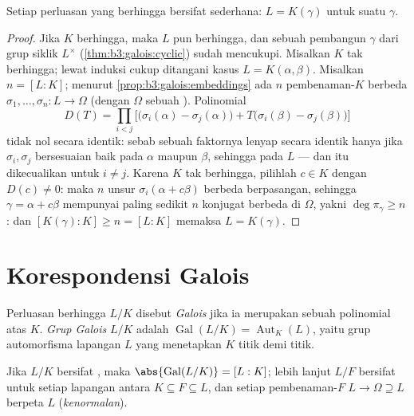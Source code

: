 \begin{theorem}\label{thm:b3:galois:primitive}
Setiap perluasan \emph{} yang berhingga bersifat sederhana: $L =
K(\gamma)$ untuk suatu $\gamma$.
\end{theorem}

\begin{proof}
Jika $K$ berhingga, maka $L$ pun berhingga, dan sebuah pembangun $\gamma$ dari
grup siklik $L^\times$ (\cref{thm:b3:galois:cyclic}) sudah mencukupi.
Misalkan $K$ tak berhingga; lewat induksi cukup ditangani kasus $L =
K(\alpha, \beta)$. Misalkan $n = [L:K]$; menurut
\cref{prop:b3:galois:embeddings} ada $n$ pembenaman-$K$ berbeda
$\sigma_1, \dots, \sigma_n \colon L \to \Omega$
(dengan $\Omega$ sebuah ). Polinomial
\[
D(T)=\prod_{i<j}\bigl[\bigl(\sigma_i(\alpha)-\sigma_j(\alpha)
\bigr) + T\bigl(\sigma_i(\beta) - \sigma_j(\beta)\bigr)\bigr]
\]
tidak nol secara identik: sebab sebuah faktornya lenyap secara identik hanya jika
$\sigma_i, \sigma_j$ bersesuaian baik pada $\alpha$ maupun $\beta$, sehingga pada
$L$ --- dan itu dikecualikan untuk $i \neq j$. Karena $K$ tak berhingga, pilihlah $c \in
K$ dengan $D(c) \ne 0$: maka $n$ unsur $\sigma_i(\alpha +
c\beta)$ berbeda berpasangan, sehingga $\gamma = \alpha + c\beta$
mempunyai paling sedikit $n$ konjugat berbeda di $\Omega$, yakni
$\deg \pi_\gamma \geq n$: dan $[K(\gamma):K] \geq n = [L:K]$ memaksa
$L = K(\gamma)$.
\end{proof}

\section{Korespondensi Galois}

\begin{definition}\label{def:b3:galois:galois}
Perluasan berhingga $L/K$ disebut \emph{Galois}
jika ia merupakan  sebuah polinomial \emph{}
atas $K$. \emph{Grup Galois} $L/K$ adalah
$\operatorname{Gal}(L/K) = \operatorname{Aut}_K(L)$, yaitu grup
automorfisma lapangan $L$ yang menetapkan $K$ titik demi titik.
\end{definition}

\begin{proposition}\label{prop:b3:galois:galoisorder}
Jika $L/K$ bersifat , maka $\abs{\operatorname{Gal}(L/K)} =
[L:K]$; lebih lanjut $L/F$ bersifat  untuk setiap lapangan antara $K
\subseteq F \subseteq L$, dan setiap pembenaman-$F$ $L \to \Omega
\supseteq L$ berpeta $L$ (\emph{kenormalan}).
\end{proposition}

